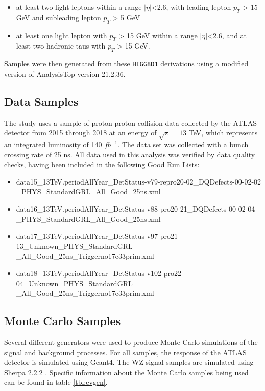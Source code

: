 \documentclass[NOTE, atlasdraft=true, texlive=2016, UKenglish]{\ATLASLATEXPATH atlasdoc}
\begin{document}
\begin{itemize}
    \item at least two light leptons within a range $|\eta|$<2.6, with leading lepton $p_{T}$ > 15 GeV and subleading lepton $p_{T}$ > 5 GeV
    \item at least one light lepton with $p_{T}$ > 15 GeV within a range $|\eta|$<2.6, and at least two hadronic taus with $p_{T}$ > 15 GeV.
\end{itemize}

Samples were then generated from these \verb|HIGG8D1| derivations using a modified version of AnalysisTop version 21.2.36.

\subsection{Data Samples}

The study uses a sample of proton-proton collision data collected by the ATLAS detector from 2015 through 2018 at an energy of $\sqrt{s} = 13$ TeV, which represents an integrated luminosity of 140 $fb^{-1}$. The data set was collected with a bunch crossing rate of 25 ns. All data used in this analysis was verified by data quality checks, having been included in the following Good Run Lists: 
\begin{itemize}
    \item data15\_13TeV.periodAllYear\_DetStatus-v79-repro20-02\_DQDefects-00-02-02\\\_PHYS\_StandardGRL\_All\_Good\_25ns.xml
    \item data16\_13TeV.periodAllYear\_DetStatus-v88-pro20-21\_DQDefects-00-02-04\\\_PHYS\_StandardGRL\_All\_Good\_25ns.xml 
    \item data17\_13TeV.periodAllYear\_DetStatus-v97-pro21-13\_Unknown\_PHYS\_StandardGRL\\\_All\_Good\_25ns\_Triggerno17e33prim.xml 
    \item data18\_13TeV.periodAllYear\_DetStatus-v102-pro22-04\_Unknown\_PHYS\_StandardGRL\\\_All\_Good\_25ns\_Triggerno17e33prim.xml
\end{itemize}

\subsection{Monte Carlo Samples}

Several different generators were used to produce Monte Carlo simulations of the signal and background processes. For all samples, the response of the ATLAS detector is simulated using Geant4. The WZ signal samples are simulated using Sherpa 2.2.2 \cite{sherpa}. Specific information about the Monte Carlo samples being used can be found in table \ref{tbl:evgen}.
\end{document}

